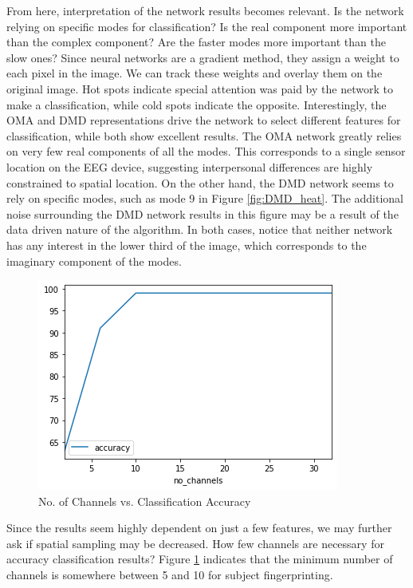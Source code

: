 From here, interpretation of the network results becomes relevant. Is the network relying on specific modes for classification? Is the real component more important than the complex component? Are the faster modes more important than the slow ones? Since neural networks are a gradient method, they assign a weight to each pixel in the image. We can track these weights and overlay them on the original image. Hot spots indicate special attention was paid by the network to make a classification, while cold spots indicate the opposite. Interestingly, the OMA and DMD representations drive the network to select different features for classification, while both show excellent results. The OMA network greatly relies on very few real components of all the modes. This corresponds to a single sensor location on the EEG device, suggesting interpersonal differences are highly constrained to spatial location. On the other hand, the DMD network seems to rely on specific modes, such as mode 9 in Figure \ref{fig:DMD_heat}. The additional noise surrounding the DMD network results in this figure may be a result of the data driven nature of the algorithm. In both cases, notice that neither network has any interest in the lower third of the image, which corresponds to the imaginary component of the modes.

\begin{figure}
\centering
\includegraphics[scale=0.55]{../../../figures/channels.png} 
\caption{No. of Channels vs. Classification Accuracy}
\label{fig:channels}
\end{figure} 
Since the results seem highly dependent on just a few features, we may further ask if spatial sampling may be decreased. How few channels are necessary for accuracy classification results? Figure \ref{fig:channels} indicates that the minimum number of channels is somewhere between 5 and 10 for subject fingerprinting.

